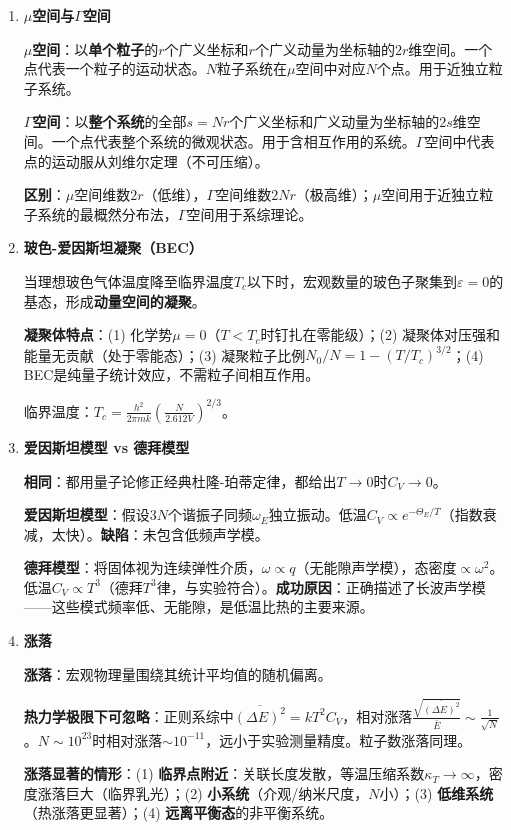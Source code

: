 \documentclass[12pt,a4paper,fontset=mac]{ctexart}
\newcommand{\đ}{\mathrm{đ}}
\begin{document}
\begin{enumerate}
\textbf{非临界态平衡稳定性条件}：$C_V>0$，$\left(\frac{\partial p}{\partial V}\right)_T<0$。

\textbf{物理含义}：$C_V>0$保证热稳定（局域温度偏高→放热降温→恢复平衡）；$\left(\frac{\partial p}{\partial V}\right)_T<0$保证力学稳定（局域体积缩小→压强增大→膨胀恢复）。违反任一条件系统将失稳。

\item \textbf{$\mu$空间与$\Gamma$空间}

\textbf{$\mu$空间}：以\textbf{单个粒子}的$r$个广义坐标和$r$个广义动量为坐标轴的$2r$维空间。一个点代表一个粒子的运动状态。$N$粒子系统在$\mu$空间中对应$N$个点。用于近独立粒子系统。

\textbf{$\Gamma$空间}：以\textbf{整个系统}的全部$s=Nr$个广义坐标和广义动量为坐标轴的$2s$维空间。一个点代表整个系统的微观状态。用于含相互作用的系统。$\Gamma$空间中代表点的运动服从刘维尔定理（不可压缩）。

\textbf{区别}：$\mu$空间维数$2r$（低维），$\Gamma$空间维数$2Nr$（极高维）；$\mu$空间用于近独立粒子系统的最概然分布法，$\Gamma$空间用于系综理论。

\item \textbf{玻色-爱因斯坦凝聚（BEC）}

当理想玻色气体温度降至临界温度$T_c$以下时，宏观数量的玻色子聚集到$\varepsilon=0$的基态，形成\textbf{动量空间的凝聚}。

\textbf{凝聚体特点}：(1) 化学势$\mu=0$（$T<T_c$时钉扎在零能级）；(2) 凝聚体对压强和能量无贡献（处于零能态）；(3) 凝聚粒子比例$N_0/N=1-(T/T_c)^{3/2}$；(4) BEC是纯量子统计效应，不需粒子间相互作用。

临界温度：$T_c=\frac{h^2}{2\pi mk}\left(\frac{N}{2.612V}\right)^{2/3}$。

\item \textbf{爱因斯坦模型 vs 德拜模型}

\textbf{相同}：都用量子论修正经典杜隆-珀蒂定律，都给出$T\to0$时$C_V\to0$。

\textbf{爱因斯坦模型}：假设$3N$个谐振子同频$\omega_E$独立振动。低温$C_V\propto e^{-\Theta_E/T}$（指数衰减，太快）。\textbf{缺陷}：未包含低频声学模。

\textbf{德拜模型}：将固体视为连续弹性介质，$\omega\propto q$（无能隙声学模），态密度$\propto\omega^2$。低温$C_V\propto T^3$（德拜$T^3$律，与实验符合）。\textbf{成功原因}：正确描述了长波声学模——这些模式频率低、无能隙，是低温比热的主要来源。

\item \textbf{涨落}

\textbf{涨落}：宏观物理量围绕其统计平均值的随机偏离。

\textbf{热力学极限下可忽略}：正则系综中$\overline{(\Delta E)^2}=kT^2C_V$，相对涨落$\frac{\sqrt{\overline{(\Delta E)^2}}}{\bar{E}}\sim\frac{1}{\sqrt{N}}$。$N\sim10^{23}$时相对涨落$\sim10^{-11}$，远小于实验测量精度。粒子数涨落同理。

\textbf{涨落显著的情形}：(1) \textbf{临界点附近}：关联长度发散，等温压缩系数$\kappa_T\to\infty$，密度涨落巨大（临界乳光）；(2) \textbf{小系统}（介观/纳米尺度，$N$小）；(3) \textbf{低维系统}（热涨落更显著）；(4) \textbf{远离平衡态}的非平衡系统。

\end{enumerate}
\end{document}
